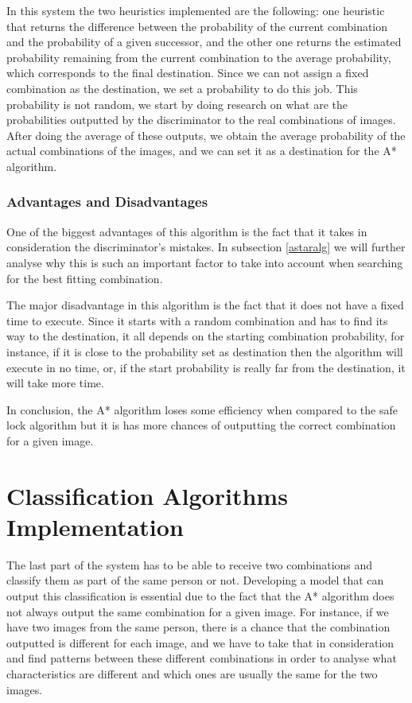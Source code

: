 \documentclass[12pt,a4paper,oneside]{memoir}
\begin{document}
\par
In this system the two heuristics implemented are the following: one heuristic that returns the difference between the probability of the current combination and the probability of a given successor, and the other one returns the estimated probability remaining from the current combination to the average probability, which corresponds to the final destination. Since we can not assign a fixed combination as the destination, we set a probability to do this job. This probability is not random, we start by doing research on what are the probabilities outputted by the discriminator to the real combinations of images. After doing the average of these outputs, we obtain the average probability of the actual combinations of the images, and we can set it as a destination for the A* algorithm.


    \subsubsection{Advantages and Disadvantages}
    One of the biggest advantages of this algorithm is the fact that it takes in consideration the discriminator's mistakes. In subsection \ref{astaralg} we will further analyse why this is such an important factor to take into account when searching for the best fitting combination.
    \par
    
    The major disadvantage in this algorithm is the fact that it does not have a fixed time to execute. Since it starts with a random combination and has to find its way to the destination, it all depends on the starting combination probability, for instance, if it is close to the probability set as destination then the algorithm will execute in no time, or, if the start probability is really far from the destination, it will take more time. 
    
    \par
    In conclusion, the A* algorithm loses some efficiency when compared to the safe lock algorithm but it is has more chances of outputting the correct combination for a given image.
    
    \label{sec:staradv}


\section{Classification Algorithms Implementation}
\label{chap:decisionalg}
The last part of the system has to be able to receive two combinations and classify them as part of the same person or not. Developing a model that can output this classification is essential due to the fact that the A* algorithm does not always output the same combination for a given image. For instance, if we have two images from the same person, there is a chance that the combination outputted is different for each image, and we have to take that in consideration and find patterns between these different combinations in order to analyse what characteristics are different and which ones are usually the same for the two images.  
\end{document}
